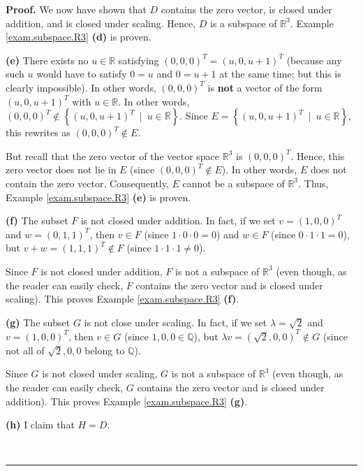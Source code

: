 \documentclass[numbers=enddot,12pt,final,onecolumn,notitlepage]{scrartcl}%
\theoremstyle{definition}
\newenvironment{proof}[1][Proof]{\noindent\textbf{#1.} }{\ \rule{0.5em}{0.5em}}
\begin{document}
\begin{proof}
We now have shown that $D$ contains the zero vector, is closed under addition,
and is closed under scaling. Hence, $D$ is a subspace of $\mathbb{R}^{3}$.
Example \ref{exam.subspace.R3} \textbf{(d)} is proven.

\textbf{(e)} There exists no $u\in\mathbb{R}$ satisfying $\left(
0,0,0\right)  ^{T}=\left(  u,0,u+1\right)  ^{T}$ (because any such $u$ would
have to satisfy $0=u$ and $0=u+1$ at the same time; but this is clearly
impossible). In other words, $\left(  0,0,0\right)  ^{T}$ is \textbf{not} a
vector of the form $\left(  u,0,u+1\right)  ^{T}$ with $u\in\mathbb{R}$. In
other words, $\left(  0,0,0\right)  ^{T}\notin\left\{  \left(  u,0,u+1\right)
^{T}\ \mid\ u\in\mathbb{R}\right\}  $. Since $E=\left\{  \left(
u,0,u+1\right)  ^{T}\ \mid\ u\in\mathbb{R}\right\}  $, this rewrites as
$\left(  0,0,0\right)  ^{T}\notin E$.

But recall that the zero vector of the vector space $\mathbb{R}^{3}$ is
$\left(  0,0,0\right)  ^{T}$. Hence, this zero vector does not lie in $E$
(since $\left(  0,0,0\right)  ^{T}\notin E$). In other words, $E$ does not
contain the zero vector. Consequently, $E$ cannot be a subspace of
$\mathbb{R}^{3}$. Thus, Example \ref{exam.subspace.R3} \textbf{(e)} is proven.

\textbf{(f)} The subset $F$ is not closed under addition. In fact, if we set
$v=\left(  1,0,0\right)  ^{T}$ and $w=\left(  0,1,1\right)  ^{T}$, then $v\in
F$ (since $1\cdot0\cdot0=0$) and $w\in F$ (since $0\cdot1\cdot1=0$), but
$v+w=\left(  1,1,1\right)  ^{T}\notin F$ (since $1\cdot1\cdot1\neq0$).

Since $F$ is not closed under addition, $F$ is not a subspace of
$\mathbb{R}^{3}$ (even though, as the reader can easily check, $F$ contains
the zero vector and is closed under scaling). This proves Example
\ref{exam.subspace.R3} \textbf{(f)}.

\textbf{(g)} The subset $G$ is not close under scaling. In fact, if we set
$\lambda=\sqrt{2}$ and $v=\left(  1,0,0\right)  ^{T}$, then $v\in G$ (since
$1,0,0\in\mathbb{Q}$), but $\lambda v=\left(  \sqrt{2},0,0\right)  ^{T}\notin
G$ (since not all of $\sqrt{2},0,0$ belong to $\mathbb{Q}$).

Since $G$ is not closed under scaling, $G$ is not a subspace of $\mathbb{R}%
^{3}$ (even though, as the reader can easily check, $G$ contains the zero
vector and is closed under addition). This proves Example
\ref{exam.subspace.R3} \textbf{(g)}.

\textbf{(h)} I claim that $H=D$.


\end{proof}
\end{document}
